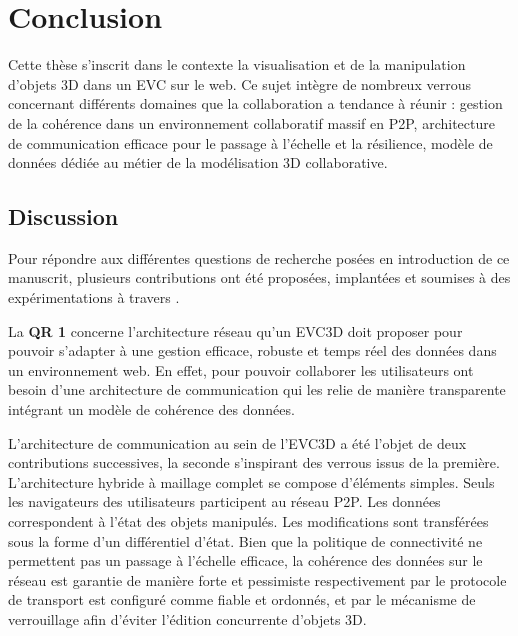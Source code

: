 \chapter{Conclusion}
\chaptertable

Cette thèse s'inscrit dans le contexte la visualisation et de la manipulation d'objets 
3D dans un \gls{EVC} sur le web. Ce sujet intègre de nombreux verrous 
concernant différents domaines que la collaboration a tendance à réunir : gestion 
de la cohérence dans un environnement collaboratif massif en \gls{P2P}, 
architecture de communication efficace pour le passage à l'échelle et la résilience, 
modèle de données dédiée au métier de la modélisation 3D collaborative. 

\section{Discussion}
Pour répondre aux différentes questions de 
recherche posées en introduction de ce manuscrit, plusieurs contributions ont été 
proposées, implantées et soumises à des expérimentations à travers 
\cite{Desprat2015a,Desprat2015b,Desprat2016,Desprat2017}. 


La \textbf{QR 1} concerne l'architecture réseau qu'un \gls{EVC3D} doit proposer 
pour 
pouvoir s'adapter à une gestion efficace, robuste et temps réel des données dans 
un environnement web. En effet, pour pouvoir collaborer les utilisateurs ont besoin 
d'une architecture de communication qui les relie de manière transparente 
intégrant un modèle de cohérence des données. 

L'architecture de communication au sein de l'\gls{EVC3D} a été l'objet de deux 
contributions successives, la seconde s'inspirant des verrous issus de la 
première. 
L'architecture hybride à maillage complet se compose d'éléments 
simples. 
Seuls 
les navigateurs des utilisateurs participent au réseau \gls{P2P}. Les données 
correspondent à l'état des objets manipulés. Les modifications sont transférées 
sous la forme d'un différentiel d'état. Bien que la politique de connectivité ne 
permettent pas un passage à l'échelle efficace, la cohérence des données sur le 
réseau est garantie de manière forte et pessimiste respectivement par le protocole 
de transport est configuré comme fiable et ordonnés, et par le mécanisme de 
verrouillage afin d'éviter l'édition concurrente d'objets 3D.

